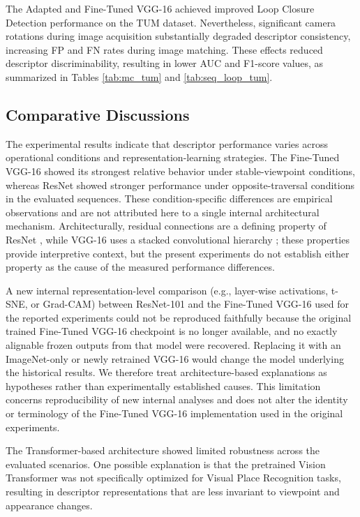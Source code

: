 \documentclass{ieeeaccess}
\newenvironment{revisionblock}
{%
  \par
  \begingroup
  \setlength{\fboxsep}{1pt}%
  \setlength{\OuterFrameSep}{0pt}%
  \def\FrameCommand##1{%
    \colorbox{white}{\color{revisionred}##1}%
  }%
  \MakeFramed{%
    \advance\hsize-2\fboxsep
    \FrameRestore
  }%
}
{%
  \endMakeFramed
  \endgroup
  \par
}
\renewenvironment{revisionblock}
  {\par\begingroup\color{revisionred}}
  {\par\endgroup}
\begin{document}
The Adapted and Fine-Tuned VGG-16 achieved improved Loop Closure Detection performance on the TUM dataset. Nevertheless, significant camera rotations during image acquisition substantially degraded descriptor consistency, increasing FP and FN rates during image matching. These effects reduced descriptor discriminability, resulting in lower AUC and F1-score values, as summarized in Tables \ref{tab:mc_tum} and \ref{tab:seq_loop_tum}.

\subsection{Comparative Discussions}

\begin{revisionblock}
The experimental results indicate that descriptor performance varies across operational conditions and representation-learning strategies. The Fine-Tuned VGG-16 showed its strongest relative behavior under stable-viewpoint conditions, whereas ResNet showed stronger performance under opposite-traversal conditions in the evaluated sequences. These condition-specific differences are empirical observations and are not attributed here to a single internal architectural mechanism. Architecturally, residual connections are a defining property of ResNet \cite{He2016ResNet}, while VGG-16 uses a stacked convolutional hierarchy \cite{Simonyan2015VGG}; these properties provide interpretive context, but the present experiments do not establish either property as the cause of the measured performance differences.

A new internal representation-level comparison (e.g., layer-wise activations, t-SNE, or Grad-CAM) between ResNet-101 and the Fine-Tuned VGG-16 used for the reported experiments could not be reproduced faithfully because the original trained Fine-Tuned VGG-16 checkpoint is no longer available, and no exactly alignable frozen outputs from that model were recovered. Replacing it with an ImageNet-only or newly retrained VGG-16 would change the model underlying the historical results. We therefore treat architecture-based explanations as hypotheses rather than experimentally established causes. This limitation concerns reproducibility of new internal analyses and does not alter the identity or terminology of the Fine-Tuned VGG-16 implementation used in the original experiments.
\end{revisionblock}

The Transformer-based architecture showed limited robustness across the evaluated scenarios. One possible explanation is that the pretrained Vision Transformer was not specifically optimized for Visual Place Recognition tasks, resulting in descriptor representations that are less invariant to viewpoint and appearance changes.
\end{document}
